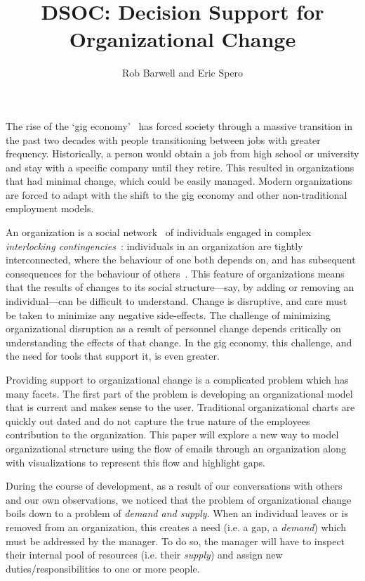 \documentclass[journal]{vgtc}                %
\title{DSOC: Decision Support for Organizational Change}
\author{Rob Barwell and Eric Spero}
\begin{document}

\maketitle


The rise of the \lq gig economy\rq{}~\cite{de2015rise,friedman2014workers} has forced society through a massive transition in the past two decades with people transitioning between jobs with greater frequency.  Historically, a person would obtain a job from high school or university and stay with a specific company until they retire.  This resulted in organizations that had minimal change, which could be easily managed. Modern organizations are forced to adapt with the shift to the gig economy and other non-traditional employment models.  

An organization is a social network~\cite{scott1988social} of individuals engaged in complex \emph{interlocking contingencies}~\cite{glenn2006complexity}: individuals in an organization are tightly interconnected, where the behaviour of one both depends on, and has subsequent consequences for the behaviour of others~\cite{glenn2006complexity}. This feature of organizations means that the results of changes to its social structure---say, by adding or removing an individual---can be difficult to understand. Change is disruptive, and care must be taken to minimize any negative side-effects. The challenge of minimizing organizational disruption as a result of personnel change depends critically on understanding the effects of that change. In the gig economy, this challenge, and the need for tools that support it, is even greater.

Providing support to organizational change is a complicated problem which has many facets.  The first part of the problem is developing an organizational model that is current and makes sense to the user.  Traditional organizational charts are quickly out dated and do not capture the true nature of the employees contribution to the organization.  This paper will explore a new way to model organizational structure using the flow of emails through an organization along with visualizations to represent this flow and highlight gaps.

During the course of development, as a result of our conversations with others and our own observations, we noticed that the problem of organizational change boils down to a problem of \emph{demand and supply}. When an individual leaves or is removed from an organization, this creates a need (i.e. a gap, a \emph{demand}) which must be addressed by the manager. To do so, the manager will have to inspect their internal pool of resources (i.e. their \emph{supply}) and assign new duties/responsibilities to one or more people.
\end{document}
